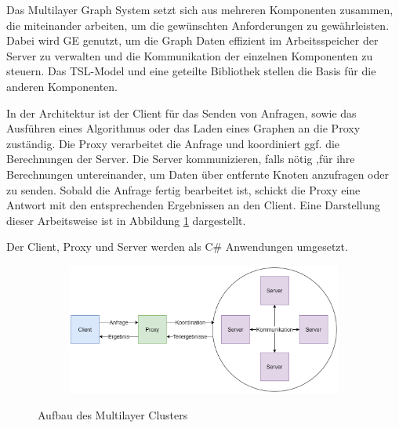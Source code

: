 Das Multilayer Graph System setzt sich aus mehreren Komponenten zusammen, die miteinander arbeiten, um die gewünschten Anforderungen zu gewährleisten.
Dabei wird GE genutzt, um die Graph Daten effizient im Arbeitsspeicher der Server zu verwalten und die Kommunikation der einzelnen Komponenten zu steuern.  Das TSL-Model und eine geteilte Bibliothek stellen die Basis für die
anderen Komponenten.

In der Architektur ist der Client für das Senden von Anfragen, sowie das Ausführen eines Algorithmus oder das Laden eines Graphen an die Proxy zuständig.
Die Proxy verarbeitet die Anfrage und koordiniert ggf. die Berechnungen der Server. Die Server kommunizieren, falls nötig ,für ihre Berechnungen untereinander, um Daten über entfernte Knoten anzufragen oder zu senden. Sobald die Anfrage fertig bearbeitet ist, schickt die Proxy eine Antwort mit den entsprechenden Ergebnissen an den Client.
Eine Darstellung dieser Arbeitsweise ist in Abbildung \ref{architektur} dargestellt.

Der Client, Proxy und Server werden als C\# Anwendungen umgesetzt. 

\begin{figure}
  \centering
  \begin{subfigure}[b]{1.0\textwidth}
    \includegraphics[width=1.0\linewidth]{img/Architektur-Cluster.png}
  \end{subfigure}
  \caption{Aufbau des Multilayer Clusters}
  \label{architektur}
\end{figure}


